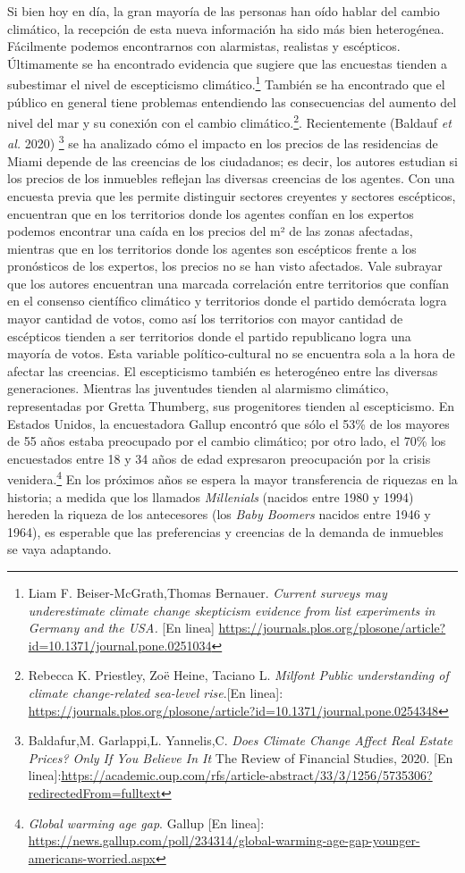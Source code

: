 \documentclass[12pt]{article}
\begin{document}
Si bien hoy en día, la gran mayoría de las personas han oído hablar del cambio climático, la recepción de esta nueva información ha sido más bien heterogénea. Fácilmente podemos encontrarnos con alarmistas, realistas y escépticos. Últimamente se ha encontrado evidencia que sugiere que las encuestas tienden a subestimar el nivel de escepticismo climático.\footnote{Liam F. Beiser-McGrath,Thomas Bernauer. \textit{Current surveys may underestimate climate change skepticism evidence from list experiments in Germany and the USA.} [En linea] \url{https://journals.plos.org/plosone/article?id=10.1371/journal.pone.0251034}} También se ha encontrado que el público en general tiene problemas entendiendo las consecuencias del aumento del nivel del mar y su conexión con el cambio climático.\footnote{Rebecca K. Priestley, Zoë Heine, Taciano L. \textit{Milfont Public understanding of climate change-related sea-level rise}.[En linea]: \url{https://journals.plos.org/plosone/article?id=10.1371/journal.pone.0254348}}. Recientemente (Baldauf \textit{et al.} 2020) \footnote{Baldafur,M. Garlappi,L. Yannelis,C. \textit{Does Climate Change Affect Real Estate Prices? Only If You Believe In It} The Review of Financial Studies, 2020. [En linea]:\url{https://academic.oup.com/rfs/article-abstract/33/3/1256/5735306?redirectedFrom=fulltext}} se ha analizado cómo el impacto en los precios de las residencias de Miami depende de las creencias de los ciudadanos;  es decir, los autores estudian si los precios de los inmuebles reflejan las diversas creencias de los agentes. Con una encuesta previa que les permite distinguir sectores creyentes y sectores escépticos, encuentran que en los territorios donde los agentes confían en los expertos podemos encontrar una caída en los precios del m² de las zonas afectadas, mientras que en los territorios donde los agentes son escépticos frente a los pronósticos de los expertos, los precios no se han visto afectados. Vale subrayar que los autores encuentran una marcada correlación entre territorios que confían en el consenso científico climático y territorios donde el partido demócrata logra mayor cantidad de votos, como así los territorios con mayor cantidad de escépticos tienden a ser territorios donde el partido republicano logra una mayoría de votos. Esta variable político-cultural no se encuentra sola a la hora de afectar las creencias. El escepticismo también es heterogéneo entre las diversas generaciones. Mientras las juventudes tienden al alarmismo climático, representadas por Gretta Thumberg, sus progenitores tienden al escepticismo. En Estados Unidos, la encuestadora Gallup encontró que sólo el 53\% de los mayores de 55 años estaba preocupado por el cambio climático; por otro lado, el 70\% los encuestados entre 18 y 34 años de edad expresaron preocupación por la crisis venidera.\footnote{\textit{Global warming age gap}. Gallup [En linea]: \url{https://news.gallup.com/poll/234314/global-warming-age-gap-younger-americans-worried.aspx}} En los próximos años se espera la mayor transferencia de riquezas en la historia; a medida que los llamados \textit{Millenials} (nacidos entre 1980 y 1994) hereden la riqueza de los antecesores (los \textit{Baby Boomers} nacidos entre 1946 y 1964), es esperable que las preferencias y creencias de la demanda de inmuebles se vaya adaptando. 
\end{document}
